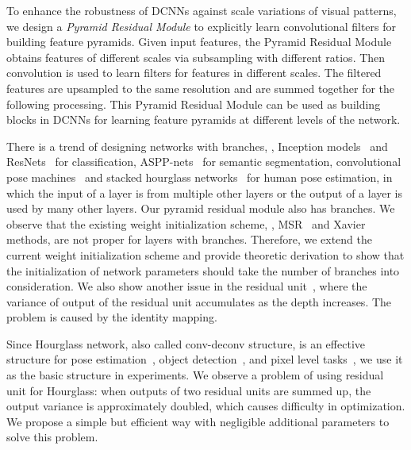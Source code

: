 \documentclass[10pt,twocolumn,letterpaper]{article}
\begin{document}
To enhance the robustness of DCNNs against scale variations of visual patterns, we design a \textit{Pyramid Residual Module} to explicitly learn convolutional filters for building feature pyramids. 
Given input features, the Pyramid Residual Module obtains features of different scales via subsampling with different ratios. 
Then convolution is used to learn filters for features in different scales. 
The filtered features are upsampled to the same resolution and are summed together for the following processing. 
This Pyramid Residual Module can be used as building blocks in DCNNs for learning feature pyramids at different levels of the network.




There is a trend of designing networks with branches, \eg, Inception models~\cite{szegedy2015going,ioffe2015batch,szegedy2016rethinking,szegedy2016inception} and ResNets~\cite{he2016deep,he2016identity} for classification, ASPP-nets~\cite{chen2016deeplab} for semantic segmentation, convolutional pose machines~\cite{wei2016convolutional} and stacked hourglass networks~\cite{newell2016stacked} for human pose estimation, in which the input of a layer is from multiple other layers or the output of a layer is used by many other layers. Our pyramid residual module also has branches. We observe that the existing weight initialization scheme, \eg, MSR~\cite{he2015delving} and Xavier~\cite{glorot2010understanding} methods, are not proper for layers with branches. 
Therefore, we extend the current weight initialization scheme and provide theoretic derivation to show that the initialization of network parameters should take the number of branches into consideration.
We also show another issue in the residual unit~\cite{he2016identity}, where the variance of output of the residual unit accumulates as the depth increases. The problem is caused by the identity mapping. 

Since Hourglass network, also called conv-deconv structure, is an effective structure for pose estimation~\cite{newell2016stacked}, object detection~\cite{li2017zoom}, and pixel level tasks~\cite{chen2016single}, we use it as the basic structure in experiments. 
We observe a problem of using residual unit for Hourglass: when outputs of two residual units are summed up, the output variance is approximately doubled, which causes difficulty in optimization. 
We propose a simple but efficient way with negligible additional parameters to solve this problem. 
\end{document}
